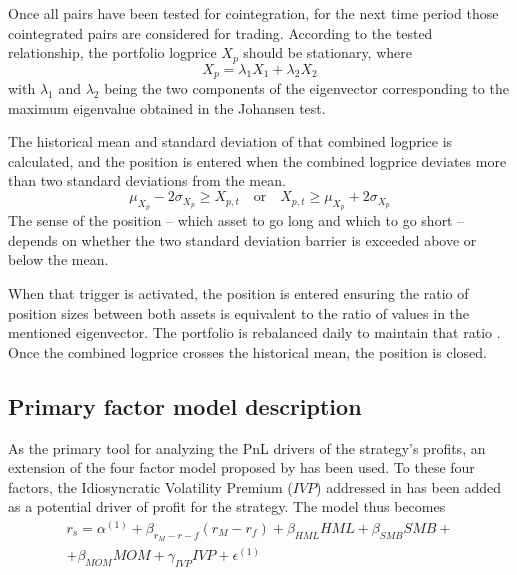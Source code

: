 Once all pairs have been tested for cointegration, for the next time period those cointegrated pairs are considered for trading. According to the tested relationship, the portfolio logprice $X_p$ should be stationary, where
\begin{equation}
    X_p = \lambda_1 X_1 + \lambda_2 X_2
\end{equation}
with $\lambda_1$ and $\lambda_2$ being the two components of the eigenvector corresponding to the maximum eigenvalue obtained in the Johansen test.

The historical mean and standard deviation of that combined logprice is calculated, and the position is entered when the combined logprice deviates more than two standard deviations from the mean. 
\begin{equation}
    \mu_{X_p} - 2\sigma_{X_p} \geq X_{p,t} \quad \text{or} \quad X_{p,t} \geq \mu_{X_p} + 2\sigma_{X_p}
\end{equation}
The sense of the position -- which asset to go long and which to go short -- depends on whether the two standard deviation barrier is exceeded above or below the mean.

When that trigger is activated, the position is entered ensuring the ratio of position sizes between both assets is equivalent to the ratio of values in the mentioned eigenvector. The portfolio is rebalanced daily to maintain that ratio \cite{chan_2013}.
Once the combined logprice crosses the historical mean, the position is closed. 

\subsection{Primary factor model description}
As the primary tool for analyzing the PnL drivers of the strategy's profits, an extension of the four factor model proposed by \cite{carhart_1997} has been used. To these four factors, the Idiosyncratic Volatility Premium ($IVP$) addressed in \cite{ioannis_2024} has been added as a potential driver of profit for the strategy. The model thus becomes
\begin{multline}
    \label{e:primary-regression}
    r_s = \alpha^{(1)} + \beta_{r_M-r-f}(r_M-r_f) + \beta_{HML}HML + \beta_{SMB}SMB + \\ + \beta_{MOM}MOM+ \gamma_{IVP}IVP + \epsilon^{(1)}
\end{multline}

